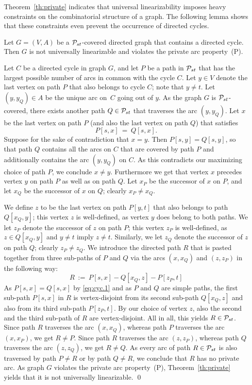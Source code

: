 \bigskip
Theorem~\ref{th:private} indicates that universal linearizability imposes heavy 
constraints on the combinatorial structure of a graph.
The following lemma shows that these constraints even prevent the occurrence of directed cycles.
\begin{lemma}
\label{le:no-cycle}
Let $G=(V,A)$ be a ${\cal P}_{st}$-covered directed graph that contains a directed cycle.
Then $G$ is not universally linearizable and violates the private arc property~(P).
\end{lemma}
\proof
Let $C$ be a directed cycle in graph $G$, and let $P$ be a path in ${\cal P}_{st}$ that has the 
largest possible number of arcs in common with the cycle $C$.
Let $y\in V$ denote the last vertex on path $P$ that also belongs to cycle $C$; note that $y\ne t$.
Let $(y,y_Q)\in A$ be the unique arc on~$C$ going out of $y$. 
As the graph $G$ is ${\cal P}_{st}$-covered, there exists another path $Q\in{\cal P}_{st}$ that traverses the arc $(y,y_Q)$.
Let $x$ be the last vertex on path $P$ (and also the last vertex on path $Q$) that satisfies
\begin{equation}
\label{eq:cyc.1}
P[s,x] ~=~ Q[s,x].
\end{equation}
Suppose for the sake of contradiction that $x=y$.
Then $P[s,y]=Q[s,y]$, so that path $Q$ contains all the arcs on $C$ that are covered by path $P$ 
and additionally contains the arc $(y,y_Q)$ on $C$.
As this contradicts our maximizing choice of path $P$, we conclude $x\ne y$.
Furthermore we get that vertex $x$ precedes vertex $y$ on path $P$ as well as on path $Q$.
Let $x_P$  be the successor of $x$ on $P$, and 
let $x_Q$  be the successor of $x$ on $Q$; clearly $x_P\ne x_Q$.

We define $z$ to be the last vertex on path $P[y,t]$ that also belongs to path $Q[x_Q,y]$;
this vertex $z$ is well-defined, as vertex $y$ does belong to both paths.
We let $z_P$ denote the successor of $z$ on path $P$; this vertex $z_P$ is well-defined, as 
$z\in Q[x_Q,y]$ and $y\ne t$ imply $z\ne t$.
Similarly, we let $z_Q$ denote the successor of $z$ on path $Q$; clearly $z_P\ne z_Q$.
We introduce the directed path $R$ that is pasted together from three sub-paths of $P$ and $Q$ 
via the arcs $(x,x_Q)$ and $(z,z_P)$ in the following way:
\begin{equation}
\label{eq:cyc.2}
R ~:=~ P[s,x] - Q[x_Q,z] - P[z_P,t] 
\end{equation}
As $P[s,x]=Q[s,x]$ by \eqref{eq:cyc.1} and as $P$ and $Q$ are simple paths, the first 
sub-path $P[s,x]$ in $R$ is vertex-disjoint from its second sub-path $Q[x_Q,z]$ and 
also from its third sub-path $P[z_P,t]$.
By our choice of vertex $z$, also the second and the third sub-path of $R$ are vertex-disjoint.
All in all, this yields $R\in{\cal P}_{st}$.
Since path $R$ traverses the arc $(x,x_Q)$, whereas path $P$ traverses the arc $(x,x_P)$, we get $R\ne P$.
Since path $R$ traverses the arc $(z,z_P)$, whereas path $Q$ traverses the arc $(z,z_Q)$, we get $R\ne Q$.
As every arc of path $R\in{\cal P}_{st}$ is also traversed by path $P\ne R$ or by path $Q\ne R$, 
we conclude that $R$ has no private arc.
As graph $G$ violates the private arc property~(P), Theorem~\ref{th:private} yields that it 
is not universally linearizable.
\qed


